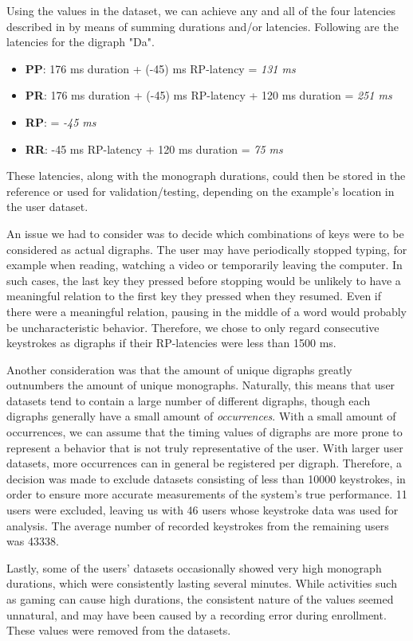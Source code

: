 Using the values in the dataset, we can achieve any and all of the four latencies described in  by means of summing durations and/or latencies.
Following are the latencies for the digraph "Da".
\begin{itemize}
    \item \textbf{PP}: 176 ms duration + (-45) ms RP-latency = \textit{131 ms}
    \item \textbf{PR}: 176 ms duration + (-45) ms RP-latency + 120 ms duration = \textit{251 ms}
    \item \textbf{RP}: = \textit{-45 ms}
    \item \textbf{RR}: -45 ms RP-latency + 120 ms duration = \textit{75 ms}
\end{itemize}
These latencies, along with the monograph durations, could then be stored in the reference or used for validation/testing, depending on the example's location in the user dataset.

An issue we had to consider was to decide which combinations of keys were to be considered as actual digraphs.
The user may have periodically stopped typing, for example when reading, watching a video or temporarily leaving the computer. 
In such cases, the last key they pressed before stopping would be unlikely to have a meaningful relation to the first key they pressed when they resumed.
Even if there were a meaningful relation, pausing in the middle of a word would probably be uncharacteristic behavior.
Therefore, we chose to only regard consecutive keystrokes as digraphs if their RP-latencies were less than 1500 ms.

Another consideration was that the amount of unique digraphs greatly outnumbers the amount of unique monographs.
Naturally, this means that user datasets tend to contain a large number of different digraphs, though each digraphs generally have a small amount of \textit{occurrences}.
With a small amount of occurrences, we can assume that the timing values of digraphs are more prone to represent a behavior that is not truly representative of the user.
With larger user datasets, more occurrences can in general be registered per digraph.
Therefore, a decision was made to exclude datasets consisting of less than 10000 keystrokes, in order to ensure more accurate measurements of the system's true performance.
11 users were excluded, leaving us with 46 users whose keystroke data was used for analysis.
The average number of recorded keystrokes from the remaining users was 43338.

Lastly, some of the users' datasets occasionally showed very high monograph durations, which were consistently lasting several minutes.
While activities such as gaming can cause high durations, the  consistent nature of the values seemed unnatural, and may have been caused by a recording error during enrollment.
These values were removed from the datasets.

